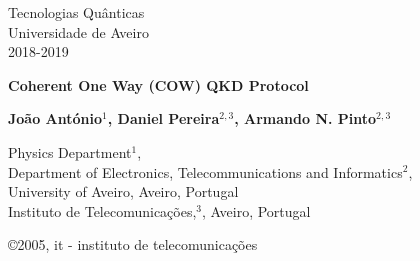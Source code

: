 \documentclass[5pt]{article}
\newcommand{\br}[1]{{\textbf{\color{itred} #1}}}%
\begin{document}
\begin{titlepage}  

\color{itblue} \sffamily \noindent \small
\hspace*{1cm}  Tecnologias Quânticas\\
\hspace*{1cm}  Universidade de Aveiro\\ %
\hspace*{1cm}  2018-2019\\ 

\vspace*{1cm}
\begin{center}
    \color{black} \sffamily \noindent \Large
    \br{Coherent One Way (COW) QKD Protocol \\}
\end{center}
\vspace{6mm}
\begin{center}
    \color{black}
    \textbf{João António$^1$, Daniel Pereira$^{2,3}$, Armando N. Pinto$^{2,3}$\\}
    {}
\end{center}

\vspace{0.0mm}
\scriptsize
\begin{center}
Physics Department$^1$,\\
Department of Electronics, Telecommunications and Informatics$^2$,\\
University of Aveiro, Aveiro, Portugal\\
Instituto de Telecomunica\c{c}\~{o}es,$^3$, Aveiro, Portugal\\
\end{center}

\vspace{1.0cm}
\hspace*{13.2cm}\tiny \copyright 2005, it - instituto de telecomunica\c{c}\~{o}es\hfill

\end{titlepage}


\renewcommand{\headsep}{-25pt}

\end{document}
